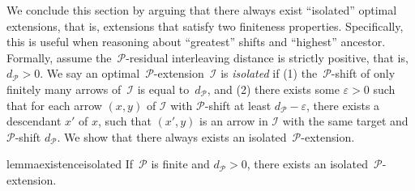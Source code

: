 \documentclass[11pt]{article}
\newcommand{\resdist}[1]{d_{#1}}
\newcommand{\eps}{\varepsilon}
\newcommand{\I}{\mathcal{I}}
\renewcommand{\P}{\mathcal{P}}
\begin{document}
We conclude this section by arguing that there always exist ``isolated'' optimal extensions, that is, extensions that satisfy two finiteness properties.
Specifically, this is useful when reasoning about ``greatest'' shifts and ``highest'' ancestor.
Formally, assume the~$\P$-residual interleaving distance is strictly positive, that is,~$\resdist{\P} > 0$.
We say an optimal~$\P$-extension~$\I$ is \emph{isolated} if (1) the~$\P$-shift of only finitely many arrows of~$\I$ is equal to~$\resdist{\P}$, and (2) there exists some $\eps>0$ such that for each arrow $(x,y)$ of $\I$ with $\P$-shift at least $\resdist{\P}-\eps$, there exists a descendant $x'$ of $x$, such that $(x',y)$ is an arrow in $\I$ with the same target and $\P$-shift $\resdist{\P}$.
We show that there always exists an isolated~$\P$-extension.
%
\begin{restatable}{lemma}{existenceisolated}
\label{lem:existence-isolated-extension}
  If~$\P$ is finite and $\resdist{\P}>0$, there exists an isolated~$\P$-extension.
\end{restatable}
\end{document}
